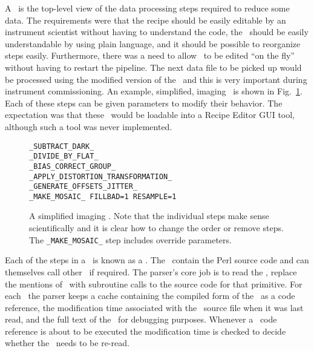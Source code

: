 \documentclass[final,authoryear,5p,times,twocolumn]{elsarticle}
\begin{document}
A \recipe\ is the top-level view of the data processing steps
required to reduce some data. The requirements were that the recipe
should be easily editable by an instrument scientist without having to
understand the code, the \recipe\ should be easily understandable by
using plain language, and it should be possible to reorganize steps
easily. Furthermore, there was a need to allow \recipes\ to be edited
``on the fly'' without having to restart the pipeline. The next data file
to be picked up would be processed using the modified version of the
\recipe\ and this is very important during instrument commissioning. An
example, simplified, imaging \recipe\ is shown in Fig.\
\ref{fig:recipe}. Each of these steps can be given parameters to
modify their behavior. The expectation was that these \recipes\ would
be loadable into a Recipe Editor GUI tool, although such a tool was
never implemented.

\begin{figure}
{
\small
\begin{verbatim}
_SUBTRACT_DARK_
_DIVIDE_BY_FLAT_
_BIAS_CORRECT_GROUP_
_APPLY_DISTORTION_TRANSFORMATION_
_GENERATE_OFFSETS_JITTER_
_MAKE_MOSAIC_ FILLBAD=1 RESAMPLE=1
\end{verbatim}
}
\caption{A simplified imaging \recipe. Note that the individual steps
  make sense scientifically and it is clear how to change the order or
  remove steps. The \texttt{\_MAKE\_MOSAIC\_} step includes override
  parameters.}
\label{fig:recipe}
\end{figure}

Each of the steps in a \recipe\ is known as a
\primitive. The \primitives\ contain the Perl source code and can
themselves call other \primitives\ if required.
The parser's core job is to read the \recipe, replace the mentions of \primitives\
with subroutine calls to the source code for that primitive. For each
\primitive\ the parser keeps a cache containing the compiled form of
the \primitive\ as a code reference, the modification time associated
with the \primitive\ source file when it was last read, and the full
text of the \primitive\ for debugging purposes. Whenever a \primitive\
code reference is about to be executed the modification time is
checked to decide whether the \primitive\ needs to be re-read.
\end{document}
